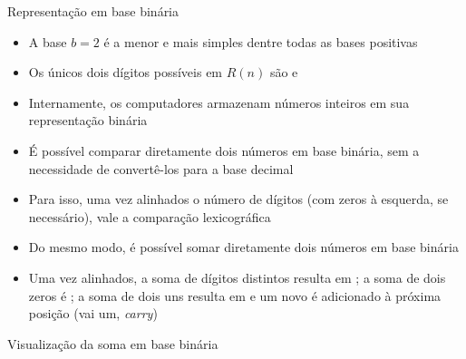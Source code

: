 \begin{frame}[fragile]{Representação em base binária}

    \begin{itemize}
        \item A base $b = 2$ é a menor e mais simples dentre todas as bases positivas

        \item Os únicos dois dígitos possíveis em $R(n)$ são  e 

        \item Internamente, os computadores armazenam números inteiros em sua representação binária

        \item É possível comparar diretamente dois números em base binária, sem a necessidade de convertê-los para a base decimal

        \item Para isso, uma vez alinhados o número de dígitos (com zeros à esquerda, se necessário), vale a comparação lexicográfica

        \item Do mesmo modo, é possível somar diretamente dois números em base binária

        \item Uma vez alinhados, a soma de dígitos distintos resulta em ; a soma de dois zeros é ; a soma de dois uns resulta em  e um novo  é adicionado à próxima posição (vai um, \textit{carry})
    \end{itemize}

\end{frame}

\begin{frame}[fragile]{Visualização da soma em base binária}

    \begin{figure}
        \centering
    \end{figure}

\end{frame}

